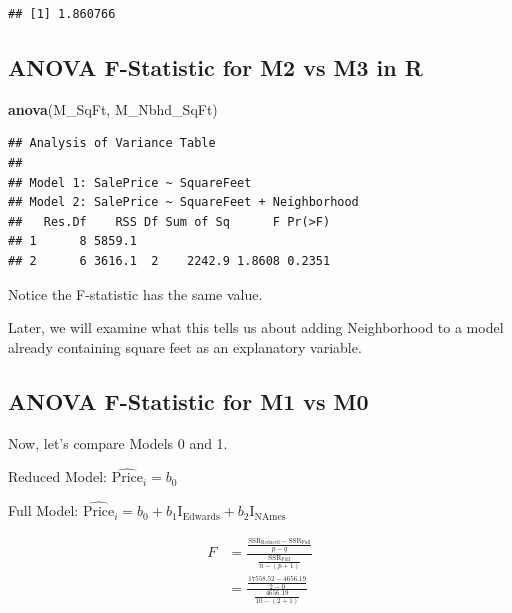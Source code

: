 \documentclass[]{book}
\newenvironment{Shaded}{\begin{snugshade}}{\end{snugshade}}
\newcommand{\KeywordTok}[1]{\textcolor[rgb]{0.13,0.29,0.53}{\textbf{#1}}}
\newcommand{\DecValTok}[1]{\textcolor[rgb]{0.00,0.00,0.81}{#1}}
\newcommand{\StringTok}[1]{\textcolor[rgb]{0.31,0.60,0.02}{#1}}
\newcommand{\OperatorTok}[1]{\textcolor[rgb]{0.81,0.36,0.00}{\textbf{#1}}}
\newcommand{\NormalTok}[1]{#1}
\begin{document}
\begin{verbatim}
## [1] 1.860766
\end{verbatim}

\subsection{ANOVA F-Statistic for M2 vs M3 in
R}\label{anova-f-statistic-for-m2-vs-m3-in-r}

\begin{Shaded}
\begin{Highlighting}[]
\KeywordTok{anova}\NormalTok{(M_SqFt, M_Nbhd_SqFt)}
\end{Highlighting}
\end{Shaded}

\begin{verbatim}
## Analysis of Variance Table
## 
## Model 1: SalePrice ~ SquareFeet
## Model 2: SalePrice ~ SquareFeet + Neighborhood
##   Res.Df    RSS Df Sum of Sq      F Pr(>F)
## 1      8 5859.1                           
## 2      6 3616.1  2    2242.9 1.8608 0.2351
\end{verbatim}

Notice the F-statistic has the same value.

Later, we will examine what this tells us about adding Neighborhood to a
model already containing square feet as an explanatory variable.

\subsection{ANOVA F-Statistic for M1 vs
M0}\label{anova-f-statistic-for-m1-vs-m0}

Now, let's compare Models 0 and 1.

Reduced Model: \(\widehat{\text{Price}}_i = b_0\)

Full Model:
\(\widehat{\text{Price}}_i = b_0 + b_1\text{I}_{\text{Edwards}} + b_2\text{I}_{\text{NAmes}}\)

\[
\begin{aligned}
F &= \frac{\frac{\text{SSR}_{\text{Reduced}}-\text{SSR}_{\text{Full}}}{p-q}}{\frac{\text{SSR}_{\text{Full}}}{n-(p+1)}} \\
&=\frac{\frac{17558.52-4656.19}{2-0}}{\frac{4656.19}{10-(2+1)}}
\end{aligned}
\]

\begin{Shaded}
\end{Shaded}
\end{document}
